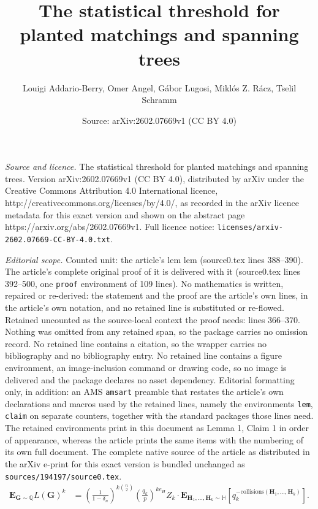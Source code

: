 \documentclass[10pt,a4paper]{amsart}
\title{The statistical threshold for planted matchings and spanning trees}
\author{Louigi Addario-Berry, Omer Angel, G\'abor Lugosi, Mikl\'os Z. R\'acz, Tselil Schramm}
\date{Source: arXiv:2602.07669v1 (CC BY 4.0)}
\newcommand{\deltanH}{\delta_{n}}
\newcommand{\bG}{\mathbf{G}}
\newcommand{\bH}{\mathbf{H}}
\newcommand{\bbH}{\mathbb{H}}
\newcommand{\bbQ}{\mathbb{Q}}
\newcommand{\e}{{\mathbf E}}
\begin{document}
\maketitle

\noindent\emph{Source and licence.} The statistical threshold for planted matchings and spanning trees. Version arXiv:2602.07669v1 (CC BY 4.0), distributed by arXiv under the Creative Commons Attribution 4.0 International licence, http://creativecommons.org/licenses/by/4.0/, as recorded in the arXiv licence metadata for this exact version and shown on the abstract page https://arxiv.org/abs/2602.07669v1. Full licence notice: \texttt{licenses/arxiv-2602.07669-CC-BY-4.0.txt}.\par\smallskip

\noindent\textit{Editorial scope.} Counted unit: the article's lem lem (source0.tex lines 388--390). The article's complete original proof of it is delivered with it (source0.tex lines 392--500, one \texttt{proof} environment of 109 lines). No mathematics is written, repaired or re-derived: the statement and the proof are the article's own lines, in the article's own notation, and no retained line is substituted or re-flowed.  Retained uncounted as the source-local context the proof needs: lines 366--370.  Nothing was omitted from any retained span, so the package carries no omission record.  No retained line contains a citation, so the wrapper carries no bibliography and no bibliography entry.  No retained line contains a figure environment, an image-inclusion command or drawing code, so no image is delivered and the package declares no asset dependency.  Editorial formatting only, in addition: an AMS \texttt{amsart} preamble that restates the article's own declarations and macros used by the retained lines, namely the environments \texttt{lem}, \texttt{claim} on separate counters, together with the standard packages those lines need.  The retained environments print in this document as Lemma 1, Claim 1 in order of appearance, whereas the article prints the same items with the numbering of its own full document.  The complete native source of the article as distributed in the arXiv e-print for this exact version is bundled unchanged as \texttt{sources/194197/source0.tex}.
\begin{align}
\e_{\bG \sim \bbQ} L(\bG)^k
&= 
\left(\frac{1}{1-\deltanH}\right)^{k\binom{n}{2}}\left(\frac{q_k}{p}\right)^{k e_H} Z_k \cdot  \e_{\bH_1,\ldots,\bH_k \sim \bbH} \left[q_k^{-\mathrm{collisions}(\bH_1,\ldots,\bH_k)}\right].\label{eq:coll-simple}
\end{align}
\end{document}
